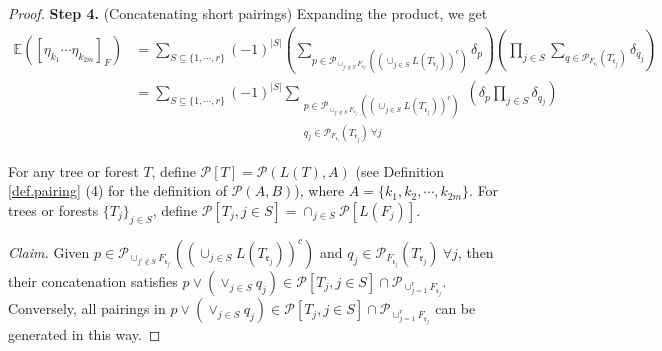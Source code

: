\begin{proof}
\textbf{Step 4.} (Concatenating short pairings) Expanding the product, we get
\begin{equation}\label{eq.lemrenorm4}
    \begin{split}
        \mathbb{E}([\eta_{k_1}\cdots \eta_{k_{2m}}]_F) &= \sum_{S\subseteq\{1,\cdots,r\}}(-1)^{|S|}
        \left(\sum_{p\in \mathcal{P}_{\cup_{j'\notin S} F_{\mathfrak{r}_{j'}}}((\cup_{j\in S}L(T_{\mathfrak{r}_j}))^c)}\delta_p\right)
        \left(\prod_{j\in S}\sum_{q\in \mathcal{P}_{F_{\mathfrak{r}_j}}(T_{\mathfrak{r}_j})} \delta_{q_j}\right)
        \\
        & =\sum_{S\subseteq\{1,\cdots,r\}}(-1)^{|S|}\sum_{\substack{p\in \mathcal{P}_{\cup_{j'\notin S} F_{\mathfrak{r}_{j'}}}((\cup_{j\in S}L(T_{\mathfrak{r}_j}))^c)
        \\q_j\in 
        \mathcal{P}_{F_{\mathfrak{r}_j}}(T_{\mathfrak{r}_j})\ \forall j}} \left(\delta_p
        \prod_{j\in S} \delta_{q_j}\right)
    \end{split}
\end{equation}

    
    
For any tree or forest $T$, define $\mathcal{P}[T]=\mathcal{P}(L(T),A)$ (see Definition \ref{def.pairing} (4) for the definition of $\mathcal{P}(A,B)$), where $A=\{k_1,k_2,\cdots,k_{2m}\}$. For trees or forests $\{T_j\}_{j\in S}$, define $\mathcal{P}[T_j,j\in S]=\cap_{j\in S}\mathcal{P}[L(F_j)]$. 

\textit{Claim.} Given $p\in \mathcal{P}_{\cup_{j'\notin S} F_{\mathfrak{r}_{j'}}}((\cup_{j\in S}L(T_{\mathfrak{r}_j}))^c)$ and $q_j\in 
\mathcal{P}_{F_{\mathfrak{r}_j}}(T_{\mathfrak{r}_j})\ \forall j$, then their concatenation satisfies $p\vee (\vee_{j\in S} q_j)\in \mathcal{P}[T_j,j\in S]\cap \mathcal{P}_{\cup_{j=1}^r F_{\mathfrak{r}_{j}}}$. Conversely, all pairings in $p\vee (\vee_{j\in S} q_j)\in \mathcal{P}[T_j,j\in S]\cap \mathcal{P}_{\cup_{j=1}^r F_{\mathfrak{r}_{j}}}$ can be generated in this way.


\end{proof}
